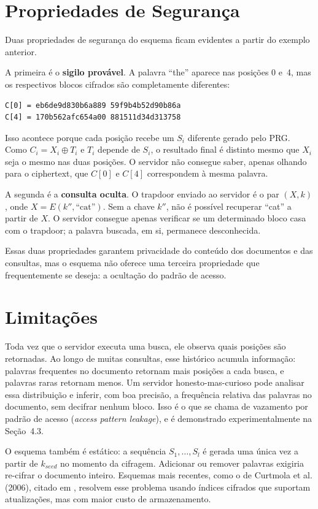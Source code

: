 \documentclass[
  12pt,
  oneside,
  a4paper,
  brazil
]{abntex2}
\begin{document}
\section{Propriedades de Segurança}

Duas propriedades de segurança do esquema ficam evidentes a partir do
exemplo anterior.

A primeira é o \textbf{sigilo provável}. A palavra ``the'' aparece nas
posições 0 e~4, mas os respectivos blocos cifrados são completamente
diferentes:

\begin{lstlisting}
C[0] = eb6de9d830b6a889 59f9b4b52d90b86a
C[4] = 170b562afc654a00 881511d34d313758
\end{lstlisting}

Isso acontece porque cada posição recebe um $S_i$ diferente gerado
pelo PRG. Como $C_i = X_i \oplus T_i$ e $T_i$ depende de $S_i$, o
resultado final é distinto mesmo que $X_i$ seja o mesmo nas duas
posições. O servidor não consegue saber, apenas olhando para o
ciphertext, que $C[0]$ e $C[4]$ correspondem à mesma palavra.

A segunda é a \textbf{consulta oculta}. O trapdoor enviado ao servidor
é o par $(X, k)$, onde $X = E(k'', \text{``cat''})$. Sem a chave $k''$,
não é possível recuperar ``cat'' a partir de $X$. O servidor consegue
apenas verificar se um determinado bloco casa com o trapdoor; a
palavra buscada, em si, permanece desconhecida.

Essas duas propriedades garantem privacidade do conteúdo dos
documentos e das consultas, mas o esquema não oferece uma terceira
propriedade que frequentemente se deseja: a ocultação do padrão de
acesso.

\section{Limitações}

Toda vez que o servidor executa uma busca, ele observa quais posições
são retornadas. Ao longo de muitas consultas, esse histórico acumula
informação: palavras frequentes no documento retornam mais posições a
cada busca, e palavras raras retornam menos. Um servidor
honesto-mas-curioso pode analisar essa distribuição e inferir, com boa
precisão, a frequência relativa das palavras no documento, sem decifrar
nenhum bloco. Isso é o que se chama de vazamento por padrão de acesso
(\textit{access pattern leakage}), e é demonstrado experimentalmente
na Seção~4.3.

O esquema também é estático: a sequência $S_1, \ldots, S_l$ é gerada
uma única vez a partir de $k_{\mathit{seed}}$ no momento da cifragem.
Adicionar ou remover palavras exigiria re-cifrar o documento inteiro.
Esquemas mais recentes, como o de Curtmola et al. (2006), citado em
\cite{wang2016}, resolvem esse problema usando índices cifrados que
suportam atualizações, mas com maior custo de armazenamento.
\end{document}
